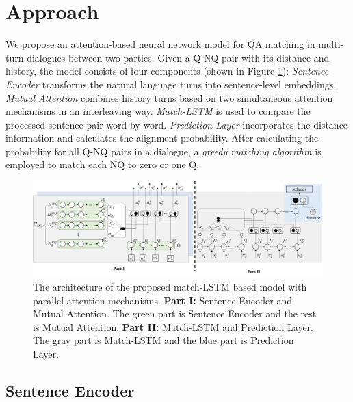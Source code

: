 \section{Approach}
\label{sec:method}

We propose an attention-based neural network model for QA matching 
in multi-turn dialogues between two parties. 
Given a Q-NQ pair with its distance and history, 
the model consists of four components (shown in Figure \ref{fig:model1}): 
\textit{Sentence Encoder} transforms the natural language turns into 
sentence-level embeddings. \textit{Mutual Attention} combines history turns 
based on two simultaneous attention mechanisms in an interleaving way. 
\textit{Match-LSTM} is used to compare the processed sentence pair word by word. 
\textit{Prediction Layer} incorporates the distance information 
and calculates the alignment probability. After calculating the probability for 
all Q-NQ pairs in a dialogue, a \textit{greedy matching algorithm} is employed to
match each NQ to zero or one Q.


\begin{figure}
	\centering
	\includegraphics[scale=0.39]{pictures/figure3_new.pdf}
	\caption{The architecture of the proposed match-LSTM based model with parallel attention mechanisms. \textbf{Part I:} Sentence Encoder and Mutual Attention. The green part is Sentence Encoder and the rest is Mutual Attention. \textbf{Part II:} Match-LSTM and Prediction Layer. The gray part is Match-LSTM and the blue part is Prediction Layer.}
	
	\label{fig:model1}
\end{figure}

\subsection{Sentence Encoder}
\label{sec:sentence-encoder}


